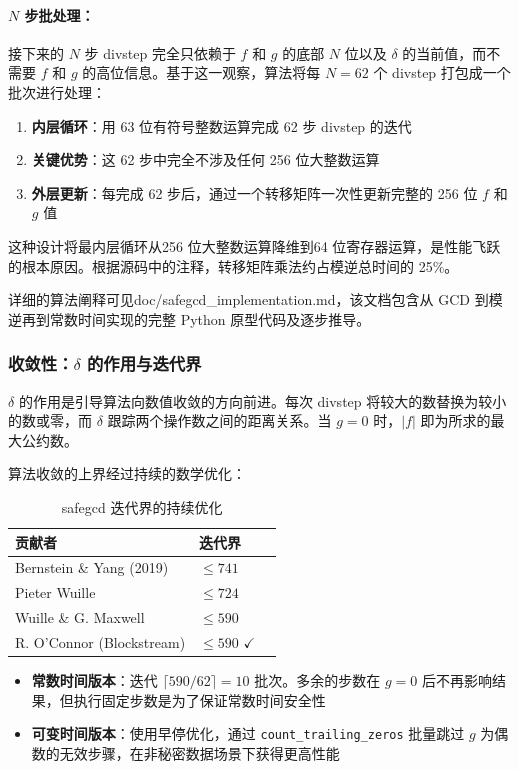 \documentclass[a4paper,12pt]{ctexart}
\begin{document}
\paragraph{$N$ 步批处理：}
接下来的 $N$ 步 divstep 完全只依赖于 $f$ 和 $g$ 的底部 $N$ 位以及 $\delta$ 的当前值，而不需要 $f$ 和 $g$ 的高位信息。基于这一观察，算法将每 $N=62$ 个 divstep 打包成一个批次进行处理：

\begin{enumerate}[leftmargin=*]
  \item \textbf{内层循环}：用 63 位有符号整数运算完成 62 步 divstep 的迭代
  \item \textbf{关键优势}：这 62 步中完全不涉及任何 256 位大整数运算
  \item \textbf{外层更新}：每完成 62 步后，通过一个转移矩阵一次性更新完整的 256 位 $f$ 和 $g$ 值
\end{enumerate}

这种设计将最内层循环从256 位大整数运算降维到64 位寄存器运算，是性能飞跃的根本原因。根据源码中的注释，转移矩阵乘法约占模逆总时间的 25\%。

详细的算法阐释可见doc/safegcd\_implementation.md，该文档包含从 GCD 到模逆再到常数时间实现的完整 Python 原型代码及逐步推导。

\subsubsection{收敛性：$\delta$ 的作用与迭代界}

$\delta$ 的作用是引导算法向数值收敛的方向前进。每次 divstep 将较大的数替换为较小的数或零，而 $\delta$ 跟踪两个操作数之间的距离关系。当 $g=0$ 时，$|f|$ 即为所求的最大公约数。

算法收敛的上界经过持续的数学优化：

\begin{table}[htbp]
  \centering
  \caption{safegcd 迭代界的持续优化}
  \begin{tabular}{@{}llc@{}}
    \toprule
    贡献者 & 迭代界 \\
    \midrule
    Bernstein \& Yang (2019)  & $\leq 741$ \\
    Pieter Wuille & $\leq 724$ \\
    Wuille \& G. Maxwell  & $\leq 590$ \\
    R. O'Connor (Blockstream)  & $\leq 590$ $\checkmark$ \\
    \bottomrule
  \end{tabular}
\end{table}

\begin{itemize}[leftmargin=*]
  \item \textbf{常数时间版本}：迭代 $\lceil 590/62 \rceil = 10$ 批次。多余的步数在 $g=0$ 后不再影响结果，但执行固定步数是为了保证常数时间安全性
  \item \textbf{可变时间版本}：使用早停优化，通过 \texttt{count\_trailing\_zeros} 批量跳过 $g$ 为偶数的无效步骤，在非秘密数据场景下获得更高性能
\end{itemize}
\end{document}
